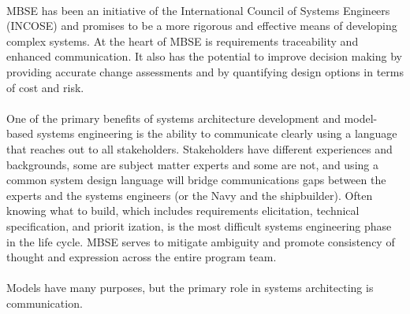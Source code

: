 \documentclass[a4paper,12pt,twoside]{report}
\begin{document}
{			\paragraph{} {MBSE has been an initiative of the International Council of Systems Engineers (INCOSE) and promises to be a more rigorous and effective means of developing complex systems. At the heart of MBSE is requirements traceability and enhanced communication. It also has the potential to improve decision making by providing accurate change assessments and by quantifying design options in terms of cost and risk. \cite{MBSESystemArchitectureNavalShipDesign}
			}
			
			\paragraph{} {One of the primary benefits of systems architecture development and model-based systems engineering is the ability to communicate clearly using a language that reaches out to all stakeholders. Stakeholders have different experiences and backgrounds, some are subject matter experts and some are not, and using a common system design language will bridge communications gaps between the experts and the systems engineers (or the Navy and the shipbuilder). Often knowing what to build, which includes requirements elicitation, technical specification, and priorit ization, is the most difficult systems engineering phase in the life cycle. MBSE serves to mitigate ambiguity and promote consistency of thought and expression across the entire program team. \cite{MBSESystemArchitectureNavalShipDesign}
			}
									
			\paragraph{} {Models have many purposes, but the primary role in systems architecting is communication. \cite{MBSESystemArchitectureNavalShipDesign}
			}
			
}
\end{document}
